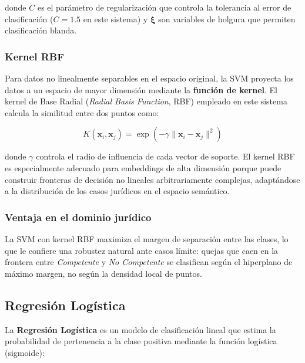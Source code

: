 donde $C$ es el parámetro de regularización que controla la tolerancia al error
de clasificación ($C = 1.5$ en este sistema) y $\boldsymbol{\xi}$ son variables
de holgura que permiten clasificación blanda.

\subsubsection*{Kernel RBF}

Para datos no linealmente separables en el espacio original, la SVM proyecta
los datos a un espacio de mayor dimensión mediante la \textbf{función de kernel}.
El kernel de Base Radial (\textit{Radial Basis Function}, RBF) empleado en este
sistema calcula la similitud entre dos puntos como:

\begin{equation}
  K(\mathbf{x}_i, \mathbf{x}_j)
  = \exp\!\left(-\gamma \|\mathbf{x}_i - \mathbf{x}_j\|^2\right)
  \label{eq:rbf}
\end{equation}

donde $\gamma$ controla el radio de influencia de cada vector de soporte. El
kernel RBF es especialmente adecuado para embeddings de alta dimensión porque
puede construir fronteras de decisión no lineales arbitrariamente complejas,
adaptándose a la distribución de los casos jurídicos en el espacio semántico.

\subsubsection*{Ventaja en el dominio jurídico}

La SVM con kernel RBF maximiza el margen de separación entre las clases, lo
que le confiere una robustez natural ante casos límite: quejas que caen en la
frontera entre \textit{Competente} y \textit{No Competente} se clasifican
según el hiperplano de máximo margen, no según la densidad local de puntos.

\subsection{Regresión Logística}

La \textbf{Regresión Logística} es un modelo de clasificación lineal que estima
la probabilidad de pertenencia a la clase positiva mediante la función
logística (sigmoide):

